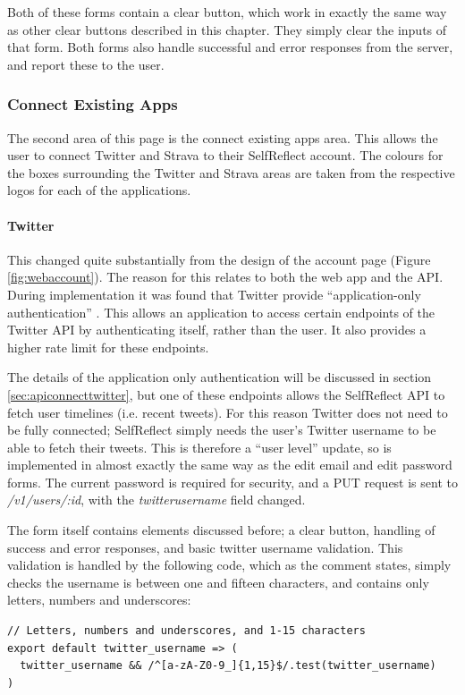 \documentclass[11pt,openright,a4paper]{report}
\begin{document}
Both of these forms contain a clear button, which work in exactly the same way as other clear buttons described in this chapter. They simply clear the inputs of that form. Both forms also handle successful and error responses from the server, and report these to the user.

\subsubsection{Connect Existing Apps} \label{subsec:webconnectapis}
The second area of this page is the connect existing apps area. This allows the user to connect Twitter and Strava to their SelfReflect account. The colours for the boxes surrounding the Twitter and Strava areas are taken from the respective logos for each of the applications.

\paragraph{Twitter} This changed quite substantially from the design of the account page (Figure \ref{fig:webaccount}). The reason for this relates to both the web app and the API. During implementation it was found that Twitter provide \enquote{application-only authentication} \parencite{twitterapponly}. This allows an application to access certain endpoints of the Twitter API by authenticating itself, rather than the user. It also provides a higher rate limit for these endpoints.

The details of the application only authentication will be discussed in section \ref{sec:apiconnecttwitter}, but one of these endpoints allows the SelfReflect API to fetch user timelines (i.e. recent tweets). For this reason Twitter does not need to be fully connected; SelfReflect simply needs the user's Twitter username to be able to fetch their tweets. This is therefore a \enquote{user level} update, so is implemented in almost exactly the same way as the edit email and edit password forms. The current password is required for security, and a PUT request is sent to \emph{/v1/users/:id}, with the \emph{twitter\textunderscore username} field changed.

The form itself contains elements discussed before; a clear button, handling of success and error responses, and basic twitter username validation. This validation is handled by the following code, which as the comment states, simply checks the username is between one and fifteen characters, and contains only letters, numbers and underscores:
\begin{lstlisting}
// Letters, numbers and underscores, and 1-15 characters
export default twitter_username => (
  twitter_username && /^[a-zA-Z0-9_]{1,15}$/.test(twitter_username)
)
\end{lstlisting}
\end{document}
